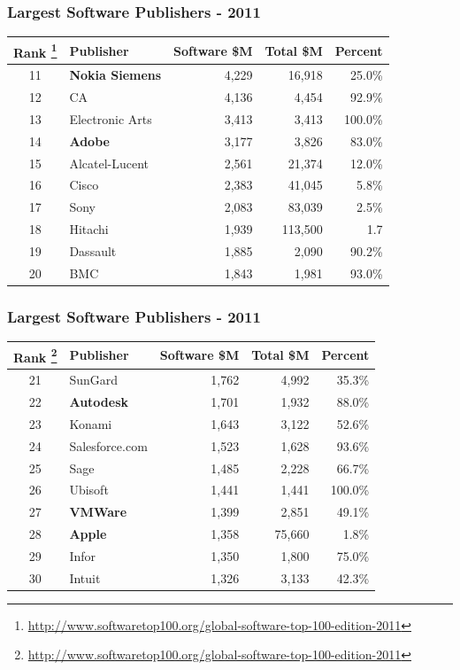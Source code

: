 \documentclass[18pt]{beamer}
\begin{document}
{
\begin{frame}
\frametitle{Largest Software Publishers - 2011}

\begin{center}
\begin{tabular}{clrrr}
\hline
  \textbf{Rank
\footnote{
\url{http://www.softwaretop100.org/global-software-top-100-edition-2011}}
} &\textbf{Publisher} & \textbf{Software \$M} & \textbf{Total \$M} & \textbf{Percent} \\
\hline
\hline
11 & \textbf{Nokia Siemens} & 4,229 & 16,918 & 25.0\% \\
12 & CA & 4,136 & 4,454 & 92.9\% \\
13 & Electronic Arts & 3,413 & 3,413 & 100.0\% \\
14 & \textbf{Adobe} & 3,177 & 3,826 & 83.0\% \\
15 & Alcatel-Lucent & 2,561 & 21,374 & 12.0\% \\
16 & Cisco & 2,383 & 41,045 & 5.8\% \\
17 & Sony & 2,083 & 83,039 & 2.5\% \\
18 & Hitachi & 1,939 & 113,500 & 1.7\\%
19 & Dassault & 1,885 & 2,090 & 90.2\% \\
20 & BMC & 1,843 & 1,981 & 93.0\% \\
\end{tabular}

\end{center}
\end{frame}
}




{
\begin{frame}
\frametitle{Largest Software Publishers - 2011}

\begin{center}
\begin{tabular}{clrrr}
\hline
  \textbf{Rank
\footnote{
\url{http://www.softwaretop100.org/global-software-top-100-edition-2011}}
} &\textbf{Publisher} & \textbf{Software \$M} & \textbf{Total \$M} & \textbf{Percent} \\
\hline
\hline
21 & SunGard & 1,762 & 4,992 & 35.3\%  \\
22 & \textbf{Autodesk} & 1,701 & 1,932 & 88.0\%  \\
23 & Konami & 1,643 & 3,122 & 52.6\%   \\
24 & Salesforce.com & 1,523 & 1,628 & 93.6\% \\
25 & Sage & 1,485 & 2,228 & 66.7\%  \\
26 & Ubisoft & 1,441 & 1,441 & 100.0\%  \\
27 & \textbf{VMWare} & 1,399 & 2,851 & 49.1\%  \\
28 & \textbf{Apple} & 1,358 & 75,660 & 1.8\%  \\
29 & Infor & 1,350 & 1,800 & 75.0\%  \\
30 & Intuit & 1,326 & 3,133 & 42.3\%  \\
\end{tabular}

\end{center}
\end{frame}
}
\end{document}
